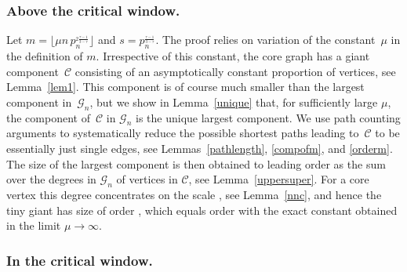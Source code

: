 \documentclass[12pt,a4paper]{article}
\numberwithin{equation}{section}
\begin{document}
\subsubsection{Above the critical window.}

Let
$m=\lfloor \mu n\,p_n^{_{2\frac{\tau-1}{3-\tau}}} \rfloor$
and $s=p_n^{_{\frac{\tau-1}{3-\tau}}}$. The proof relies on variation of the constant~$\mu$ in the definition of $m$. 
Irrespective of this constant, 
the core graph has a giant component~$\mathscr C$ consisting of an asymptotically constant proportion of vertices,
see Lemma~\ref{lem1}. This component is of course much smaller than the largest component in~$\mathscr G_n$, but we show in Lemma~\ref{unique} that, for sufficiently large $\mu$,
the component of~$\mathscr C$  in $\mathscr G_n$ is the unique largest component. We  use path counting arguments to systematically reduce the possible shortest paths leading to~$\mathscr C$ to be essentially just single edges, see Lemmas~\ref{pathlength}, \ref{compofm}, and \ref{orderm}. The size of the largest component is then obtained to leading order as the sum over the degrees in $\mathscr G_n$  of vertices in $\mathscr C$, see Lemma~\ref{uppersuper}. For a core vertex this degree concentrates on the scale ,
see Lemma~\ref{nnc}, and hence the tiny giant has size of order
, which equals order
with the exact constant obtained in the limit $\mu\to\infty$.

\subsubsection{In the critical window.}
\end{document}
